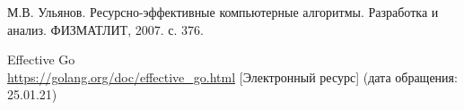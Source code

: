 


\begin{thebibliography}{8}

    М.В. Ульянов. Ресурсно-эффективные компьютерные алгоритмы. Разработка и анализ. ФИЗМАТЛИТ, 2007. с. 376.

    Effective Go
    \\\url{https://golang.org/doc/effective_go.html}
    [Электронный ресурс] (дата обращения: 25.01.21)

\end{thebibliography}